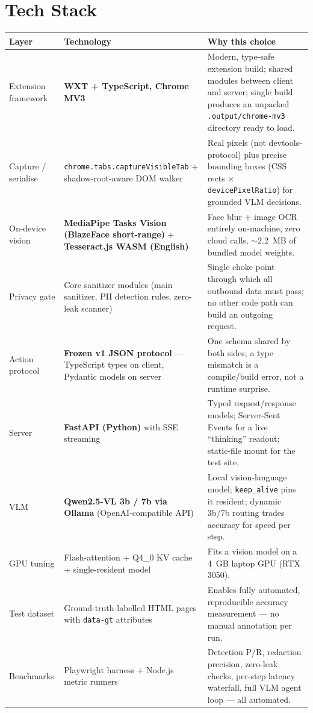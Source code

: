\documentclass[11pt,a4paper]{article}
\newcommand{\code}[1]{\texttt{#1}}
\begin{document}
\section{Tech Stack}

\begin{table}[H]
\centering
\small
\begin{tabularx}{\textwidth}{@{}>{\raggedright\arraybackslash}p{3.4cm} p{5.2cm} X@{}}
\toprule
\textbf{Layer} & \textbf{Technology} & \textbf{Why this choice}\\
\midrule
Extension framework & \textbf{WXT + TypeScript, Chrome MV3} & Modern, type-safe extension build; shared modules between client and server; single build produces an unpacked \code{.output/chrome-mv3} directory ready to load.\\
\addlinespace
Capture / serialise & \code{chrome.tabs.captureVisibleTab} + shadow-root-aware DOM walker & Real pixels (not devtools-protocol) plus precise bounding boxes (CSS rects $\times$ \code{devicePixelRatio}) for grounded VLM decisions.\\
\addlinespace
On-device vision & \textbf{MediaPipe Tasks Vision (BlazeFace short-range)} + \textbf{Tesseract.js WASM (English)} & Face blur + image OCR entirely on-machine, zero cloud calls, $\sim$2.2~MB of bundled model weights.\\
\addlinespace
Privacy gate & Core sanitizer modules (main sanitizer, PII detection rules, zero-leak scanner) & Single choke point through which all outbound data must pass; no other code path can build an outgoing request.\\
\addlinespace
Action protocol & \textbf{Frozen v1 JSON protocol} --- TypeScript types on client, Pydantic models on server & One schema shared by both sides; a type mismatch is a compile/build error, not a runtime surprise.\\
\addlinespace
Server & \textbf{FastAPI (Python)} with SSE streaming & Typed request/response models; Server-Sent Events for a live ``thinking'' readout; static-file mount for the test site.\\
\addlinespace
VLM & \textbf{Qwen2.5-VL 3b / 7b via Ollama} (OpenAI-compatible API) & Local vision-language model; \code{keep\_alive} pins it resident; dynamic 3b/7b routing trades accuracy for speed per step.\\
\addlinespace
GPU tuning & Flash-attention + Q4\_0 KV cache + single-resident model & Fits a vision model on a 4~GB laptop GPU (RTX 3050).\\
\addlinespace
Test dataset & Ground-truth-labelled HTML pages with \code{data-gt} attributes & Enables fully automated, reproducible accuracy measurement --- no manual annotation per run.\\
\addlinespace
Benchmarks & Playwright harness + Node.js metric runners & Detection P/R, redaction precision, zero-leak checks, per-step latency waterfall, full VLM agent loop --- all automated.\\
\bottomrule
\end{tabularx}
\end{table}
\end{document}
